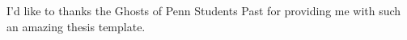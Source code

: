 I'd like to thanks the Ghosts of Penn Students Past for providing me with such an amazing thesis template.
